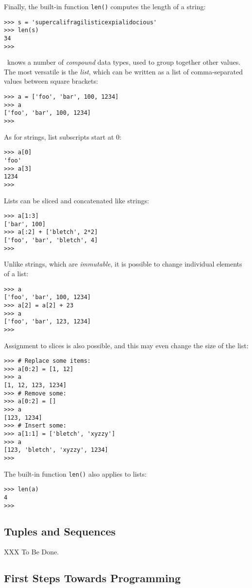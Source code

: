 Finally, the built-in function {\tt len()} computes the length of a
string:
\bcode\begin{verbatim}
>>> s = 'supercalifragilisticexpialidocious'
>>> len(s)
34
>>> 
\end{verbatim}\ecode
\Python\ knows a number of
{\em compound}
data types, used to group together other values.
The most versatile is the
{\em list},
which can be written as a list of comma-separated values between square
brackets:
\bcode\begin{verbatim}
>>> a = ['foo', 'bar', 100, 1234]
>>> a
['foo', 'bar', 100, 1234]
>>> 
\end{verbatim}\ecode
As for strings, list subscripts start at 0:
\bcode\begin{verbatim}
>>> a[0]
'foo'
>>> a[3]
1234
>>> 
\end{verbatim}\ecode
Lists can be sliced and concatenated like strings:
\bcode\begin{verbatim}
>>> a[1:3]
['bar', 100]
>>> a[:2] + ['bletch', 2*2]
['foo', 'bar', 'bletch', 4]
>>> 
\end{verbatim}\ecode
Unlike strings, which are
{\em immutable},
it is possible to change individual elements of a list:
\bcode\begin{verbatim}
>>> a
['foo', 'bar', 100, 1234]
>>> a[2] = a[2] + 23
>>> a
['foo', 'bar', 123, 1234]
>>>
\end{verbatim}\ecode
Assignment to slices is also possible, and this may even change the size
of the list:
\bcode\begin{verbatim}
>>> # Replace some items:
>>> a[0:2] = [1, 12]
>>> a
[1, 12, 123, 1234]
>>> # Remove some:
>>> a[0:2] = []
>>> a
[123, 1234]
>>> # Insert some:
>>> a[1:1] = ['bletch', 'xyzzy']
>>> a
[123, 'bletch', 'xyzzy', 1234]
>>> 
\end{verbatim}\ecode
The built-in function {\tt len()} also applies to lists:
\bcode\begin{verbatim}
>>> len(a)
4
>>> 
\end{verbatim}\ecode

\subsection{Tuples and Sequences}

XXX To Be Done.

\subsection{First Steps Towards Programming}

